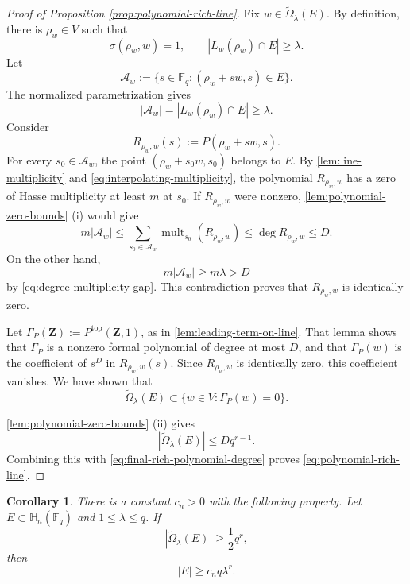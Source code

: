 \documentclass[11pt,letterpaper]{amsart}
\numberwithin{equation}{section}
\newtheorem{corollary}[corollary]{Corollary}
\theoremstyle{definition}
\theoremstyle{remark}
\newcommand{\Fq}{\mathbb F_q}
\newcommand{\HH}{\mathbb H}
\begin{document}
\begin{proof}[Proof of Proposition \ref{prop:polynomial-rich-line}]
Fix $w\in \widetilde\Omega_\lambda(E)$. By definition, there is $\rho_w\in V$ such that
\[
 \sigma(\rho_w,w)=1,
 \qquad
 |L_w(\rho_w)\cap E|\geq\lambda.
\]
Let
\[
 \mathcal A_w
 :=
 \{s\in\Fq:(\rho_w+sw,s)\in E\}.
\]
The normalized parametrization gives
\[
 |\mathcal A_w|=|L_w(\rho_w)\cap E|\geq\lambda.
\]
Consider
\[
 R_{\rho_w,w}(s):=P(\rho_w+sw,s).
\]
For every $s_0\in\mathcal A_w$, the point $(\rho_w+s_0w,s_0)$ belongs to $E$.
By \cref{lem:line-multiplicity} and
\eqref{eq:interpolating-multiplicity}, the
polynomial $R_{\rho_w,w}$ has a zero of Hasse multiplicity at least $m$ at $s_0$. If $R_{\rho_w,w}$ were nonzero,
\cref{lem:polynomial-zero-bounds} (i) would give
\[
 m|\mathcal A_w|
 \leq
 \sum_{s_0\in\mathcal A_w}\operatorname{mult}_{s_0}(R_{\rho_w,w})
 \leq
 \deg R_{\rho_w,w}
 \leq D.
\]
On the other hand,
\[
 m|\mathcal A_w|\geq m\lambda>D
\]
by \eqref{eq:degree-multiplicity-gap}.  This contradiction proves
that $R_{\rho_w,w}$ is identically zero.


Let $\Gamma_P(\mathbf Z):=P^{\mathrm{top}}(\mathbf Z,1)$, as in
\cref{lem:leading-term-on-line}. That lemma shows that $\Gamma_P$ is a nonzero formal polynomial of degree at most $D$, and that $\Gamma_P(w)$ is the coefficient of $s^D$ in $R_{\rho_w,w}(s)$. Since $R_{\rho_w,w}$ is identically zero, this coefficient vanishes. We have shown
that
\begin{equation}\label{eq:rich-vectors-zero-set}
 \widetilde\Omega_\lambda(E)
 \subset
 \{w\in V:\Gamma_P(w)=0\}.
\end{equation}

\cref{lem:polynomial-zero-bounds} (ii) gives
\[
 |\widetilde\Omega_\lambda(E)|\leq Dq^{r-1}.
\]
Combining this with \eqref{eq:final-rich-polynomial-degree} proves
\eqref{eq:polynomial-rich-line}.
\end{proof}

\begin{corollary}
\label{cor:positive-proportion-directions}
There is a constant $c_n>0$ with the following property.  Let
$E\subset\HH_n(\Fq)$ and $1\leq\lambda\leq q$.  If
\begin{equation}\label{eq:positive-proportion-hypothesis}
 |\widetilde\Omega_\lambda(E)|\geq\frac12q^r,
\end{equation}
then
\begin{equation}\label{eq:positive-proportion-conclusion}
 |E|\geq c_nq\lambda^r.
\end{equation}
\end{corollary}
\end{document}
